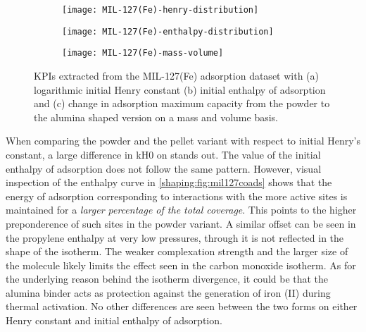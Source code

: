 \begin{figure}[p!]
	\centering
	\begin{subfigure}{\linewidth}
		\parbox[c]{0.1\linewidth}{\caption{}%
			\label{shaping:fig:analysismil127henry}}%
		\parbox[b]{0.8\linewidth}{%
			\texttt{[image: MIL-127(Fe)-henry-distribution]}%
		}%
	\end{subfigure}%

	\begin{subfigure}{\linewidth}
		\parbox[c]{0.1\linewidth}{\caption{}%
			\label{shaping:fig:analysismil127enth}}%
		\parbox[b]{0.8\linewidth}{%
			\texttt{[image: MIL-127(Fe)-enthalpy-distribution]}%
		}%
	\end{subfigure}%

	\begin{subfigure}{\linewidth}
		\parbox[c]{0.1\linewidth}{\caption{}%
			\label{shaping:fig:analysismil127basis}}%
		\parbox[b]{0.8\linewidth}{%
			\texttt{[image: MIL-127(Fe)-mass-volume]}%
		}%
	\end{subfigure}%

	\caption{\glspl{KPI} extracted from the MIL-127(Fe) adsorption dataset with
		(a) logarithmic initial Henry constant (b) initial enthalpy of
        adsorption and (c) change in adsorption maximum capacity from 
        the powder to the alumina shaped version on a mass and volume 
		basis.
	}\label{shaping:fig:analysismil127}
\end{figure}

When comparing the powder and the pellet variant with respect to
initial Henry's constant, a large difference in \gls{kH0} on 
stands out. The value of the initial enthalpy of adsorption
does not follow the same pattern.
However, visual inspection of the enthalpy curve in
\autoref{shaping:fig:mil127coads} shows that the energy of
adsorption corresponding to
interactions with the more active sites is maintained for a \textit{larger
percentage of the total coverage}.
This points to the higher preponderence of such sites in the powder
variant. A similar offset can be seen in the propylene enthalpy at very
low pressures, through it is not reflected in the shape of the isotherm.
The weaker complexation strength and the larger size of the molecule
likely limits the effect seen in the carbon monoxide isotherm.
As for the underlying reason behind the isotherm divergence, it
could be that the alumina binder acts as protection against the
generation of iron (II) during thermal activation.
No other differences are seen between the two forms on either Henry
constant and initial enthalpy of adsorption.

